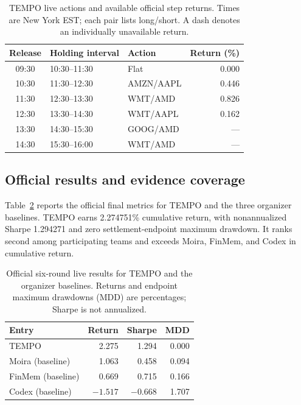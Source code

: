 \documentclass[conference]{IEEEtran}
\begin{document}
\begin{table}[!tb]
\centering
\caption{TEMPO live actions and available official step returns. Times are New York EST; each pair lists long/short. A dash denotes an individually unavailable return.}
\label{tab:live_actions}
\small
\setlength{\tabcolsep}{3pt}
\begin{tabular}{cllr}
\toprule
Release & Holding interval & Action & Return (\%)\\
\midrule
09:30 & 10:30--11:30 & Flat & 0.000\\
10:30 & 11:30--12:30 & AMZN/AAPL & 0.446\\
11:30 & 12:30--13:30 & WMT/AMD & 0.826\\
12:30 & 13:30--14:30 & WMT/AAPL & 0.162\\
13:30 & 14:30--15:30 & GOOG/AMD & ---\\
14:30 & 15:30--16:00 & WMT/AMD & ---\\
\bottomrule
\end{tabular}
\end{table}

\subsection{Official results and evidence coverage}
Table~\ref{tab:live_results} reports the official final metrics for TEMPO and the three organizer baselines\cite{task2livefinal}. TEMPO earns 2.274751\% cumulative return, with nonannualized Sharpe 1.294271 and zero settlement-endpoint maximum drawdown. It ranks second among participating teams and exceeds Moira, FinMem, and Codex in cumulative return.

\begin{table}[!tb]
\centering
\caption{Official six-round live results for TEMPO and the organizer baselines. Returns and endpoint maximum drawdowns (MDD) are percentages; Sharpe is not annualized.}
\label{tab:live_results}
\begin{tabular}{lrrr}
\toprule
Entry & Return & Sharpe & MDD\\
\midrule
TEMPO & 2.275 & 1.294 & 0.000\\
Moira (baseline) & 1.063 & 0.458 & 0.094\\
FinMem (baseline) & 0.669 & 0.715 & 0.166\\
Codex (baseline) & $-1.517$ & $-0.668$ & 1.707\\
\bottomrule
\end{tabular}
\end{table}
\end{document}
